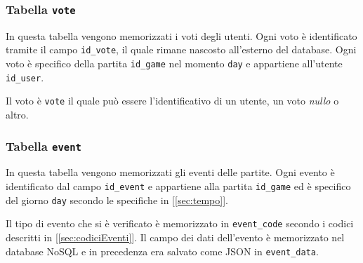 \subsubsection{Tabella \texttt{vote}}

In questa tabella vengono memorizzati i voti degli utenti. Ogni voto è identificato tramite il campo \texttt{id\_vote}, il quale rimane nascosto all'esterno del database. Ogni voto è specifico della partita \texttt{id\_game} nel momento \texttt{day} e appartiene all'utente \texttt{id\_user}. 

Il voto è \texttt{vote} il quale può essere l'identificativo di un utente, un voto \emph{nullo} o altro. 



\subsubsection{Tabella \texttt{event}}

In questa tabella vengono memorizzati gli eventi delle partite. Ogni evento è identificato dal campo \texttt{id\_event} e appartiene alla partita \texttt{id\_game} ed è specifico del giorno \texttt{day} secondo le specifiche in [\ref{sec:tempo}].

Il tipo di evento che si è verificato è memorizzato in \texttt{event\_code} secondo i codici descritti in [\ref{sec:codiciEventi}]. Il campo dei dati dell'evento è memorizzato nel database NoSQL e in precedenza era salvato come JSON in \texttt{event\_data}.


